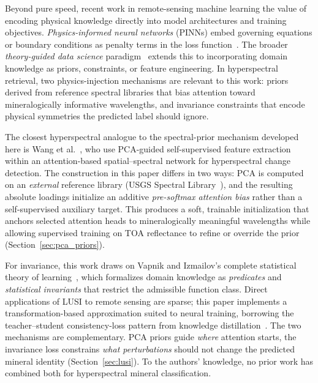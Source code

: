 \documentclass[preprint,12pt]{elsarticle}
\begin{document}
Beyond pure speed, recent work in remote-sensing machine learning the value of encoding physical knowledge directly into model architectures and training objectives. 
\emph{Physics-informed neural networks} (PINNs) embed governing equations or boundary conditions as penalty terms in the loss function~\cite{raissi2019pinn}.
The broader \emph{theory-guided data science} paradigm~\cite{karpatne2017tgds} extends this to incorporating domain knowledge as priors, constraints, or feature engineering. 
In hyperspectral retrieval, two physics-injection mechanisms are relevant to this work: priors derived from reference spectral libraries that bias attention toward mineralogically informative wavelengths, and invariance constraints that encode physical symmetries the predicted label should ignore.

The closest hyperspectral analogue to the spectral-prior mechanism developed here is Wang et al.~\cite{wang2021attention_pca_guided}, who use PCA-guided self-supervised feature extraction within an attention-based spatial--spectral network for hyperspectral change detection. 
The construction in this paper differs in two ways: PCA is computed on an \emph{external} reference library (USGS Spectral Library~\cite{kokaly2017usgs}), and the resulting absolute loadings initialize an additive \emph{pre-softmax attention bias} rather than a self-supervised auxiliary target. 
This produces a soft, trainable initialization that anchors selected attention heads to mineralogically meaningful wavelengths while allowing supervised training on TOA reflectance to refine or override the prior (Section~\ref{sec:pca_priors}).

For invariance, this work draws on Vapnik and Izmailov's complete statistical theory of learning~\cite{vapnik2020}, which formalizes domain knowledge as \emph{predicates} and \emph{statistical invariants} that restrict the admissible function class. 
Direct applications of LUSI to remote sensing are sparse; this paper implements a transformation-based approximation suited to neural training, borrowing the teacher--student consistency-loss pattern from knowledge distillation~\cite{hinton2015distilling}. 
The two mechanisms are complementary. 
PCA priors guide \emph{where} attention starts, the invariance loss constrains \emph{what perturbations} should not change the predicted mineral identity (Section~\ref{sec:lusi}).
To the authors' knowledge, no prior work has combined both for hyperspectral mineral classification.

\end{document}

